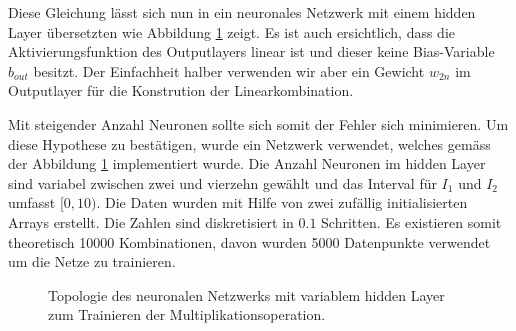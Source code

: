 Diese Gleichung lässt sich nun in ein neuronales Netzwerk mit einem hidden Layer übersetzten wie Abbildung \ref{fig:mst_variable_hidden_layer} zeigt. Es ist auch ersichtlich, dass die Aktivierungsfunktion des Outputlayers linear ist und dieser keine Bias-Variable $b_{out}$ besitzt. Der Einfachheit halber verwenden wir aber ein Gewicht $w_{2n}$ im Outputlayer für die Konstrution der Linearkombination.

Mit steigender Anzahl Neuronen sollte sich somit der Fehler sich minimieren. Um diese Hypothese zu bestätigen, wurde ein Netzwerk verwendet, welches gemäss der Abbildung \ref{fig:mst_variable_hidden_layer} implementiert wurde. Die Anzahl Neuronen im hidden Layer sind variabel zwischen zwei und vierzehn gewählt und das Interval für $I_1$ und $I_2$ umfasst $[0, 10)$. Die Daten wurden mit Hilfe von zwei zufällig initialisierten Arrays erstellt. Die Zahlen sind diskretisiert in $0.1$ Schritten. Es existieren somit theoretisch 10000 Kombinationen, davon wurden 5000 Datenpunkte verwendet um die Netze zu trainieren.

\begin{figure}
	\centering
	\label{fig:mst_variable_hidden_layer}
	\caption{Topologie des neuronalen Netzwerks mit variablem hidden Layer zum Trainieren der Multiplikationsoperation.}
\end{figure}

